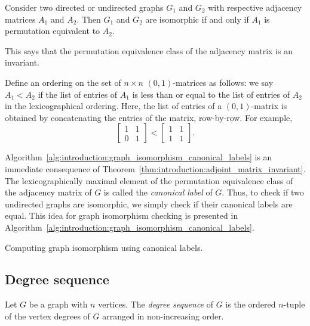 \begin{theorem}
\label{thm:introduction:adjoint_matrix_invariant}
Consider two directed or undirected graphs $G_1$ and $G_2$ with
respective adjacency matrices $A_1$ and $A_2$. Then $G_1$ and $G_2$
are isomorphic if and only if $A_1$ is permutation equivalent to
$A_2$.
\end{theorem}

This says that the permutation equivalence class of the adjacency
matrix is an invariant.

Define an ordering on the set of $n \times n$ $(0, 1)$-matrices as
follows: we say $A_1 < A_2$ if the list of entries of $A_1$ is less
than or equal to the list of entries of $A_2$ in the lexicographical
ordering. Here, the list of entries of a $(0, 1)$-matrix is obtained
by concatenating the entries of the matrix, row-by-row. For example,
\[
\begin{bmatrix}
1 & 1 \\
0 & 1
\end{bmatrix}
<
\begin{bmatrix}
1 & 1 \\
1 & 1
\end{bmatrix}.
\]

Algorithm~\ref{alg:introduction:graph_isomorphism_canonical_labels} is
an immediate consequence of
Theorem~\ref{thm:introduction:adjoint_matrix_invariant}. The
lexicographically maximal element of the permutation equivalence class
of the adjacency matrix of $G$ is called the \emph{canonical label} of
$G$. Thus, to check if two undirected graphs are isomorphic, we simply
check if their canonical labels are equal. This idea for graph
isomorphism checking is presented in
Algorithm~\ref{alg:introduction:graph_isomorphism_canonical_labels}.

\begin{algorithm}[!htpb]

\caption{Computing graph isomorphism using canonical labels.}
\label{alg:introduction:graph_isomorphism_canonical_labels}
\end{algorithm}



\subsection{Degree sequence}

Let $G$ be a graph with $n$ vertices. The \emph{degree sequence} of
$G$ is the ordered $n$-tuple of the vertex degrees of $G$ arranged in
non-increasing order.

